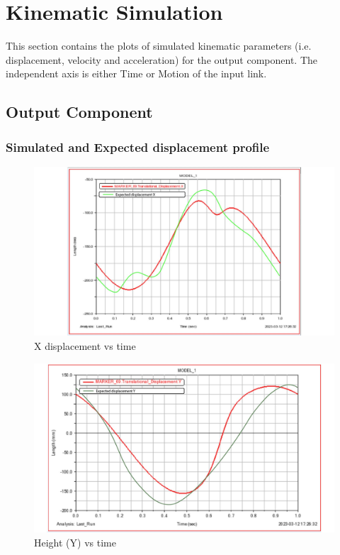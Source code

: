 \section{Kinematic Simulation} 
    This section contains the plots of simulated kinematic parameters (i.e. displacement, velocity and acceleration) for the output component. The independent axis is either Time or Motion of the input link.

    \subsection{Output Component}
        \subsubsection{Simulated and Expected displacement profile}
            \begin{figure}[hbt!]
                \centering
                \includegraphics[width=0.9\columnwidth]{Images/x_disp madhav-01.jpg}
                \caption{X displacement vs time}
                \label{fig:x_disp}
            \end{figure}

            \begin{figure}[hbt!]
                \centering
                \includegraphics[width=0.9\columnwidth]{Images/height_variation madhav-01.jpg}
                \caption{Height (Y) vs time}
                \label{fig:y_disp}
            \end{figure}

